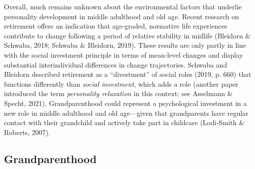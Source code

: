 \documentclass[
  english,
  man, noextraspace,floatsintext]{apa7}
\begin{document}
Overall, much remains unknown about the environmental factors that underlie personality development in middle adulthood and old age. Recent research on retirement offers an indication that age-graded, normative life experiences contribute to change following a period of relative stability in midlife (Bleidorn \& Schwaba, 2018; Schwaba \& Bleidorn, 2019). These results are only partly in line with the social investment principle in terms of mean-level changes and display substantial interindividual differences in change trajectories. Schwaba and Bleidorn described retirement as a \enquote{divestment} of social roles (2019, p. 660) that functions differently than \emph{social investment}, which adds a role (another paper introduced the term \emph{personality relaxation} in this context; see Asselmann \& Specht, 2021). Grandparenthood could represent a psychological investment in a new role in middle adulthood and old age---given that grandparents have regular contact with their grandchild and actively take part in childcare (Lodi-Smith \& Roberts, 2007).

\hypertarget{grandparenthood}{%
\subsection{Grandparenthood}\label{grandparenthood}}
\end{document}
